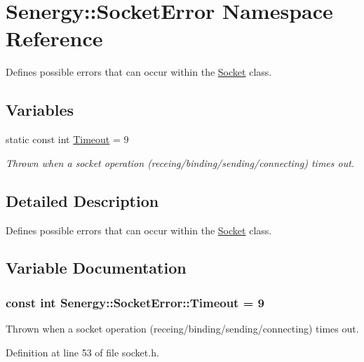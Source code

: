 \hypertarget{namespace_senergy_1_1_socket_error}{\section{Senergy\-:\-:Socket\-Error Namespace Reference}
\label{namespace_senergy_1_1_socket_error}
}


Defines possible errors that can occur within the \hyperlink{class_senergy_1_1_socket}{Socket} class.  


\subsection*{Variables}
\begin{DoxyCompactItemize}
\item 
static const int \hyperlink{namespace_senergy_1_1_socket_error_aa78be48fe668e1748c69b145a3c3fe16}{Timeout} = 9
\begin{DoxyCompactList}\small\item\em Thrown when a socket operation (receing/binding/sending/connecting) times out. \end{DoxyCompactList}\end{DoxyCompactItemize}


\subsection{Detailed Description}
Defines possible errors that can occur within the \hyperlink{class_senergy_1_1_socket}{Socket} class. 

\subsection{Variable Documentation}
\hypertarget{namespace_senergy_1_1_socket_error_aa78be48fe668e1748c69b145a3c3fe16}{
\subsubsection[{Timeout}]{\setlength{\rightskip}{0pt plus 5cm}const int Senergy\-::\-Socket\-Error\-::\-Timeout = 9\hspace{0.3cm}{\ttfamily [static]}}}\label{namespace_senergy_1_1_socket_error_aa78be48fe668e1748c69b145a3c3fe16}


Thrown when a socket operation (receing/binding/sending/connecting) times out. 



Definition at line 53 of file socket.\-h.


